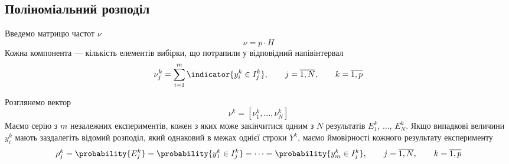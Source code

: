 \subsection{Поліноміальний розподіл}
Введемо матрицю частот $\nu$
\begin{equation*}
  \nu = p \cdot H
\end{equation*}
Кожна компонента --- кількість елементів вибірки, що потрапили у відповідний
напівінтервал
\begin{equation*}
  \nu_j^k = \sum_{i=1}^{m} \indicator{y_i^k \in I_j^k},
  \qquad j = \overline{1, N},
  \qquad k = \overline{1, p}
\end{equation*}

Розглянемо вектор
\begin{equation*}
  \nu^k = \left[ \nu_1^k, \dots, \nu_N^k \right]
\end{equation*}
Маємо серію з $m$ незалежних експериментів, кожен з яких може закінчитися
одним з $N$ результатів $E_1^k$, $\dots$, $E_N^k$.
Якщо випадкові величини $y_i^k$ мають заздалегіть відомий
розподіл, який однаковий в межах однієї строки $Y^k$, маємо ймовірності
кожного результату експерименту
\begin{equation*}
  \rho_j^k = \probability{E_j^k} = \probability{y_1^k \in I_j^k}
  = \dots = \probability{y_m^k \in I_j^k},
  \qquad j = \overline{1,N},
  \qquad k = \overline{1,p}
\end{equation*}

